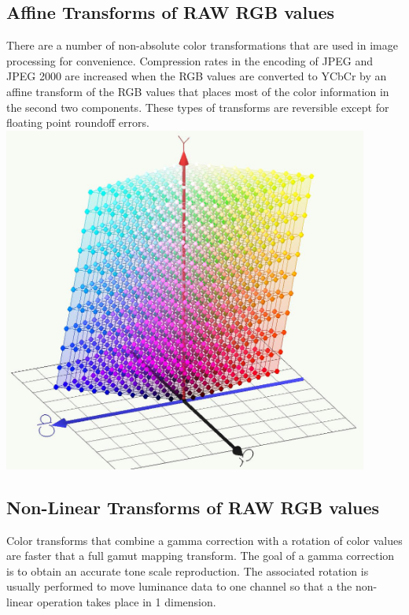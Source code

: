 \documentclass{amsart}
\theoremstyle{definition}
\theoremstyle{remark}
\numberwithin{equation}{section}
\begin{document}
\subsection{Affine Transforms of RAW RGB values}
There are a number of non-absolute color transformations that are used in image processing for convenience.  Compression rates in the encoding of JPEG and JPEG 2000 are increased when the RGB values are converted to YCbCr by an affine transform of the RGB values that places most of the color information in the second two components.
These types of transforms are reversible except for floating point roundoff errors.
\includegraphics[width=12.0cm]{RGB_TO_YCBCR.jpg}

\subsection{Non-Linear Transforms of RAW RGB values}
Color transforms that combine a gamma correction with a rotation of color values are faster that a full gamut mapping transform. The goal of a gamma correction is to obtain an accurate tone scale reproduction.  The associated rotation is usually performed to move luminance data to one channel so that a the non-linear operation takes place in 1 dimension.
\end{document}
